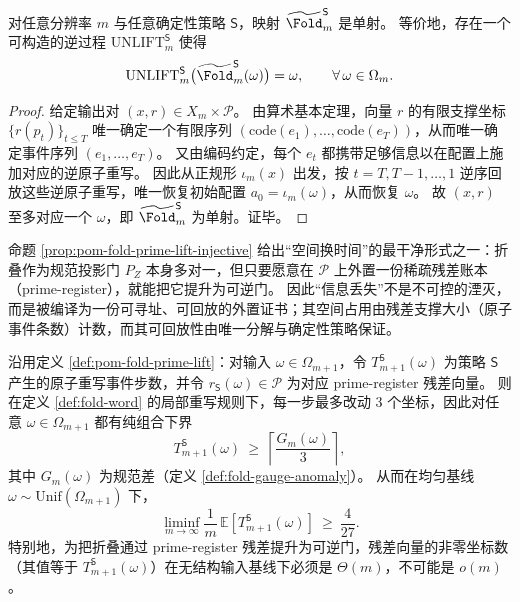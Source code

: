 \begin{proposition}\label{prop:pom-fold-prime-lift-injective}
对任意分辨率 \(m\) 与任意确定性策略 \(\mathsf S\)，映射 \(\widetilde{\Fold}^{\mathsf S}_m\) 是单射。
等价地，存在一个可构造的逆过程 \(\mathrm{UNLIFT}^{\mathsf S}_m\) 使得
\[
\mathrm{UNLIFT}^{\mathsf S}_m\bigl(\widetilde{\Fold}^{\mathsf S}_m(\omega)\bigr)=\omega,\qquad \forall\,\omega\in\Omega_m.
\]
\end{proposition}
\begin{proof}
给定输出对 \((x,r)\in X_m\times\mathcal P\)。
由算术基本定理，向量 \(r\) 的有限支撑坐标 \(\{r(p_t)\}_{t\le T}\) 唯一确定一个有限序列 \((\mathrm{code}(e_1),\dots,\mathrm{code}(e_T))\)，从而唯一确定事件序列 \((e_1,\dots,e_T)\)。
又由编码约定，每个 \(e_t\) 都携带足够信息以在配置上施加对应的逆原子重写。
因此从正规形 \(\iota_m(x)\) 出发，按 \(t=T,T{-}1,\dots,1\) 逆序回放这些逆原子重写，唯一恢复初始配置 \(a_0=\iota_m(\omega)\)，从而恢复 \(\omega\)。
故 \((x,r)\) 至多对应一个 \(\omega\)，即 \(\widetilde{\Fold}^{\mathsf S}_m\) 为单射。证毕。
\end{proof}\begin{remark}\label{rem:pom-fold-lossless}
命题 \ref{prop:pom-fold-prime-lift-injective} 给出“空间换时间”的最干净形式之一：折叠作为规范投影门 \(P_Z\) 本身多对一，但只要愿意在 \(\mathcal P\) 上外置一份稀疏残差账本（prime-register），就能把它提升为可逆门。
因此“信息丢失”不是不可控的湮灭，而是被编译为一份可寻址、可回放的外置证书；其空间占用由残差支撑大小（原子事件条数）计数，而其可回放性由唯一分解与确定性策略保证。
\end{remark}\begin{corollary}\label{cor:pom-prime-residual-linear-lb}
沿用定义 \ref{def:pom-fold-prime-lift}：对输入 $\omega\in\Omega_{m+1}$，令 $T_{m+1}^{\mathsf S}(\omega)$ 为策略 $\mathsf S$ 产生的原子重写事件步数，并令 $r_{\mathsf S}(\omega)\in\mathcal P$ 为对应 prime-register 残差向量。
则在定义 \ref{def:fold-word} 的局部重写规则下，每一步最多改动 $3$ 个坐标，因此对任意 $\omega\in\Omega_{m+1}$ 都有纯组合下界
\[
T_{m+1}^{\mathsf S}(\omega)\ \ge\ \left\lceil \frac{G_m(\omega)}{3}\right\rceil ,
\]
其中 $G_m(\omega)$ 为规范差（定义 \ref{def:fold-gauge-anomaly}）。
从而在均匀基线 $\omega\sim\mathrm{Unif}(\Omega_{m+1})$ 下，
\[
\liminf_{m\to\infty}\frac{1}{m}\,\mathbb E\!\left[T_{m+1}^{\mathsf S}(\omega)\right]\ \ge\ \frac{4}{27}.
\]
特别地，为把折叠通过 prime-register 残差提升为可逆门，残差向量的非零坐标数（其值等于 $T_{m+1}^{\mathsf S}(\omega)$）在无结构输入基线下必须是 $\Theta(m)$，不可能是 $o(m)$。
\end{corollary}
